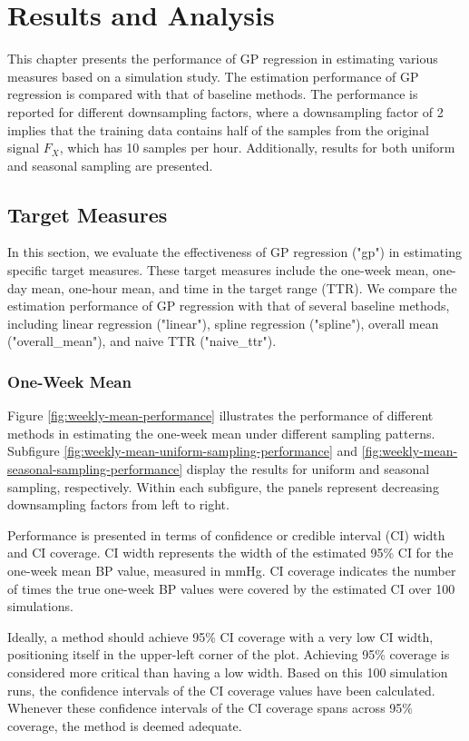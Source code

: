 \chapter{Results and Analysis}\label{ch:results}

This chapter presents the performance of GP regression in estimating various
measures based on a simulation study.
The estimation performance of GP regression is compared with that of baseline methods.
The performance is reported for different downsampling factors, where a downsampling
factor of 2 implies that the training data contains half of the samples from the
original signal $F_X$, which has 10 samples per hour.
Additionally, results for both uniform and seasonal sampling are presented.

\section{Target Measures}

In this section, we evaluate the effectiveness of GP regression ("gp") in
estimating specific target measures. These target measures include the one-week mean,
one-day mean, one-hour mean, and time in the target range (TTR).
We compare the estimation performance of GP regression with that of several baseline methods,
including linear regression ("linear"), spline regression ("spline"), overall mean
("overall\_mean"), and naive TTR ("naive\_ttr").

\subsection{One-Week Mean}

Figure \ref{fig:weekly-mean-performance} illustrates the performance of different
methods in estimating the one-week mean under different sampling patterns.
Subfigure \ref{fig:weekly-mean-uniform-sampling-performance} and
\ref{fig:weekly-mean-seasonal-sampling-performance} display the results
for uniform and seasonal sampling, respectively. Within each subfigure, the panels
represent decreasing downsampling factors from left to right.

Performance is presented in terms of confidence or credible interval (CI) width and CI coverage.
CI width represents the width of the estimated 95\% CI for the one-week mean BP value,
measured in mmHg. CI coverage indicates the number of times the true one-week BP
values were covered by the estimated CI over 100 simulations.

Ideally, a method should achieve 95\% CI coverage with a very low CI width,
positioning itself in the upper-left corner of the plot. Achieving 95\% coverage
is considered more critical than having a low width.
Based on this 100 simulation runs, the confidence intervals
of the CI coverage values have been calculated.
Whenever these confidence intervals of the CI coverage
spans across 95\% coverage, the method is deemed adequate.

